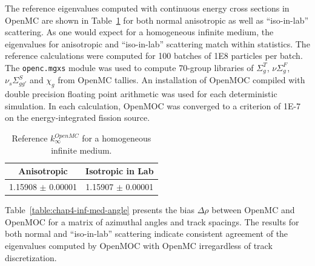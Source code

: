 The reference eigenvalues computed with continuous energy cross sections in OpenMC are shown in Table~\ref{table:chap4-inf-med-reference} for both normal anisotropic as well as ``iso-in-lab'' scattering. As one would expect for a homogeneous infinite medium, the eigenvalues for anisotropic and ``iso-in-lab'' scattering match within statistics.  The reference calculations were computed for 100 batches of 1E8 particles per batch. The \texttt{openc.mgxs} module was used to compute 70-group libraries of $\Sigma^T_g$, $\nu\Sigma^F_g$, $\nu_s\Sigma^S_{gg'}$ and $\chi_g$ from OpenMC tallies. An installation of OpenMOC compiled with double precision floating point arithmetic was used for each deterministic simulation. In each calculation, OpenMOC was converged to a criterion of 1E-7 on the energy-integrated fission source.

\begin{table}[h!]
  \centering
  \caption[Reference $k^{OpenMC}_{\infty}$ for an infinite medium]{Reference $k^{OpenMC}_{\infty}$ for a homogeneous infinite medium.}
  \small
  \label{table:chap4-inf-med-reference} 
  \vspace{6pt}
  \begin{tabular}{c c}
  \toprule
  \multicolumn{1}{c}{\bf Anisotropic} &
  \multicolumn{1}{c}{\bf Isotropic in Lab} \\
  \midrule
  1.15908 $\pm$ 0.00001 & 1.15907 $\pm$ 0.00001 \\
  \bottomrule
\end{tabular}
\end{table}

Table~\ref{table:chap4-inf-med-angle} presents the bias $\Delta\rho$ between OpenMC and OpenMOC for a matrix of azimuthal angles and track spacings. The results for both normal and ``iso-in-lab'' scattering indicate consistent agreement of the eigenvalues computed by OpenMOC with OpenMC irregardless of track discretization.


